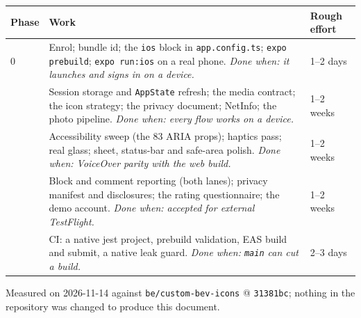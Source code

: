 \documentclass[11pt]{article}
\newcommand{\code}[1]{\texttt{\small #1}}
\begin{document}
\vspace{0.4em}
\renewcommand{\arraystretch}{1.45}
\noindent\begin{tabular}{@{}p{}p{}p{}@{}}
\toprule
\textbf{Phase} & \textbf{Work} & \textbf{Rough effort} \\
\midrule
0 & Enrol; bundle id; the \code{ios} block in \code{app.config.ts}; \code{expo prebuild};
    \code{expo run:ios} on a real phone. \newline
    \textit{Done when: it launches and signs in on a device.} & 1--2 days \\
\addlinespace[0.35em]
1 & Session storage and \code{AppState} refresh; the media contract; the icon strategy; the privacy
    document; NetInfo; the photo pipeline. \newline
    \textit{Done when: every flow works on a device.} & 1--2 weeks \\
\addlinespace[0.35em]
2 & Accessibility sweep (the 83 ARIA props); haptics pass; real glass; sheet, status-bar and
    safe-area polish. \newline
    \textit{Done when: VoiceOver parity with the web build.} & 1--2 weeks \\
\addlinespace[0.35em]
3 & Block and comment reporting (both lanes); privacy manifest and disclosures; the rating
    questionnaire; the demo account. \newline
    \textit{Done when: accepted for external TestFlight.} & 1--2 weeks \\
\addlinespace[0.35em]
4 & CI: a native jest project, prebuild validation, EAS build and submit, a native leak guard.
    \newline \textit{Done when: \code{main} can cut a build.} & 2--3 days \\
\bottomrule
\end{tabular}
\renewcommand{\arraystretch}{1.0}

\vspace{0.7em}
{\color{mute}\small\noindent Measured on 2026-11-14 against \code{be/custom-bev-icons} @
\code{31381bc}; nothing in the repository was changed to produce this document.\par}
\end{document}
